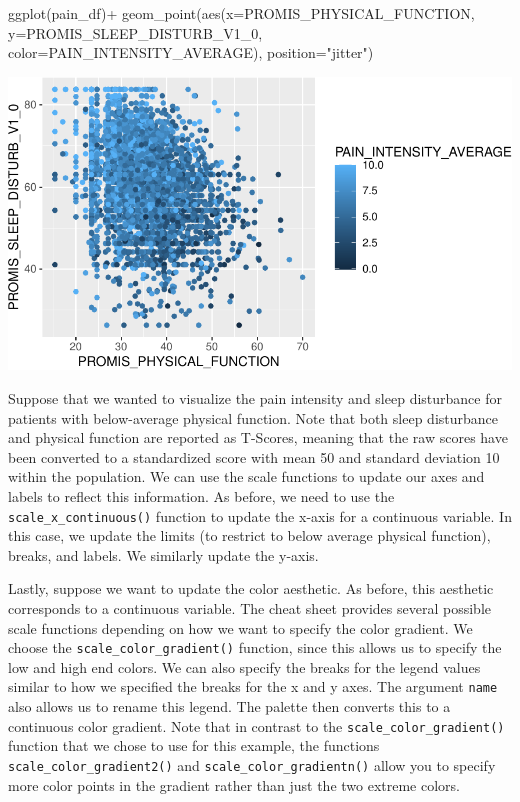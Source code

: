 \documentclass[
  letterpaper,
]{krantz}
\makeatletter
\newenvironment{Shaded}{\begin{snugshade}}{\end{snugshade}}
\newcommand{\AttributeTok}[1]{\textcolor[rgb]{0.40,0.45,0.13}{#1}}
\newcommand{\FunctionTok}[1]{\textcolor[rgb]{0.28,0.35,0.67}{#1}}
\newcommand{\NormalTok}[1]{\textcolor[rgb]{0.00,0.23,0.31}{#1}}
\newcommand{\SpecialCharTok}[1]{\textcolor[rgb]{0.37,0.37,0.37}{#1}}
\newcommand{\StringTok}[1]{\textcolor[rgb]{0.13,0.47,0.30}{#1}}
\newenvironment{kframe}{%
\medskip{}
\setlength{\fboxsep}{.8em}
 \def\at@end@of@kframe{}%
 \ifinner\ifhmode%
  \def\at@end@of@kframe{\end{minipage}}%
  \begin{minipage}{\columnwidth}%
 \fi\fi%
 \def\FrameCommand##1{\hskip\@totalleftmargin \hskip-\fboxsep
 \colorbox{shadecolor}{##1}\hskip-\fboxsep
     \hskip-\linewidth \hskip-\@totalleftmargin \hskip\columnwidth}%
 \MakeFramed {\advance\hsize-\width
   \@totalleftmargin\z@ \linewidth\hsize
   \@setminipage}}%
 {\par\unskip\endMakeFramed%
 \at@end@of@kframe}
\renewenvironment{Shaded}{\begin{kframe}}{\end{kframe}}
\makeatother
\begin{document}
\begin{Shaded}
\begin{Highlighting}[]
\FunctionTok{ggplot}\NormalTok{(pain\_df)}\SpecialCharTok{+}
  \FunctionTok{geom\_point}\NormalTok{(}\FunctionTok{aes}\NormalTok{(}\AttributeTok{x=}\NormalTok{PROMIS\_PHYSICAL\_FUNCTION, }
                 \AttributeTok{y=}\NormalTok{PROMIS\_SLEEP\_DISTURB\_V1\_0, }
                 \AttributeTok{color=}\NormalTok{PAIN\_INTENSITY\_AVERAGE), }\AttributeTok{position=}\StringTok{"jitter"}\NormalTok{)}
\end{Highlighting}
\end{Shaded}

\begin{center}
\includegraphics[width=1\textwidth,height=\textheight]{book/visualization_ggplot_files/figure-pdf/unnamed-chunk-9-1.pdf}
\end{center}

Suppose that we wanted to visualize the pain intensity and sleep
disturbance for patients with below-average physical function. Note that
both sleep disturbance and physical function are reported as T-Scores,
meaning that the raw scores have been converted to a standardized score
with mean 50 and standard deviation 10 within the population. We can use
the scale functions to update our axes and labels to reflect this
information. As before, we need to use the
\texttt{scale\_x\_continuous()} function to update the x-axis for a
continuous variable. In this case, we update the limits (to restrict to
below average physical function), breaks, and labels. We similarly
update the y-axis.

Lastly, suppose we want to update the color aesthetic. As before, this
aesthetic corresponds to a continuous variable. The cheat sheet provides
several possible scale functions depending on how we want to specify the
color gradient. We choose the \texttt{scale\_color\_gradient()}
function, since this allows us to specify the low and high end colors.
We can also specify the breaks for the legend values similar to how we
specified the breaks for the x and y axes. The argument \texttt{name}
also allows us to rename this legend. The palette then converts this to
a continuous color gradient. Note that in contrast to the
\texttt{scale\_color\_gradient()} function that we chose to use for this
example, the functions \texttt{scale\_color\_gradient2()} and
\texttt{scale\_color\_gradientn()} allow you to specify more color
points in the gradient rather than just the two extreme colors.
\end{document}
